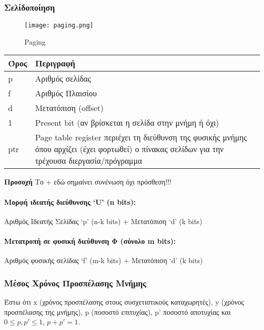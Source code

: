 \subsubsection{Σελίδοποίηση}

\begin{figure}[!ht]
	\centering
	\texttt{[image: paging.png]}
	\caption{Paging}
\end{figure}

\begin{center}
\begin{tabularx}{0.5\textwidth}{|X|X|}
	\hline
	Όρος & Περιγραφή \\
	\hline
	p & Αριθμός σελίδας \\
	\hline
	f & Αριθμός Πλαισίου \\
	\hline
	d & Μετατόπιση (offset)\\
	\hline
	1 & Present bit (αν βρίσκεται η σελίδα στην μνήμη ή όχι) \\
	\hline
	ptr & {Page table register περιέχει τη διεύθυνση της φυσικής
	μνήμης όπου αρχίζει (έχει φορτωθεί) ο πίνακας σελίδων
	για την τρέχουσα διεργασία/πρόγραμμα } \\
	\hline
\end{tabularx}
\end{center}

\textbf{Προσοχή} Το + εδώ σημαίνει συνένωση όχι πρόσθεση!!! \\

\paragraph{Μορφή ιδεατής διεύθυνσης `U' (n bits):} Αριθμός Ιδεατής Σελίδας `p' (n-k bits) +
Μετατόπιση `d' (k bits) \\

\paragraph{Μετατροπή σε φυσική διεύθυνση Φ (σύνολο m bits):} Αριθμός φυσικής σελίδας `f' (m-k bits)  +
Μετατόπιση `d' (k bits)

\subsubsection{Μέσος Χρόνος Προσπέλασης Μνήμης}

Έστω ότι x (χρόνος προσπέλασης στους συσχετιστικούς καταχωρητές), y (χρόνος προσπέλασης της μνήμης),
p (ποσοστό επιτυχίας), p' ποσοστό αποτυχίας και $ 0 \le p, p' \le 1$, $ p + p' = 1$.

